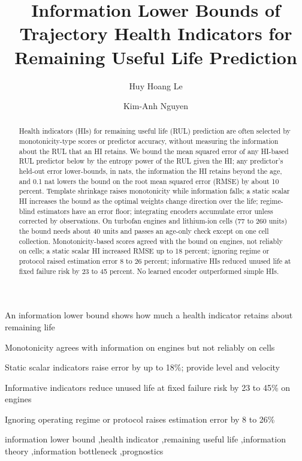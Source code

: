 \documentclass[preprint,12pt]{elsarticle}
\theoremstyle{definition}
\begin{document}
\linenumbers
\begin{frontmatter}
\title{Information Lower Bounds of Trajectory Health Indicators for Remaining Useful Life Prediction}
\author[pm]{Huy Hoang Le}
\author[dut]{Kim-Anh Nguyen}

\begin{highlights}
\item An information lower bound shows how much a health indicator retains about remaining life
\item Monotonicity agrees with information on engines but not reliably on cells
\item Static scalar indicators raise error by up to 18\%; provide level and velocity
\item Informative indicators reduce unused life at fixed failure risk by 23 to 45\% on engines
\item Ignoring operating regime or protocol raises estimation error by 8 to 26\%
\end{highlights}

\begin{abstract}
Health indicators (HIs) for remaining useful life (RUL) prediction are often selected by monotonicity-type scores or predictor accuracy, without measuring the information about the RUL that an HI retains. We bound the mean squared error of any HI-based RUL predictor below by the entropy power of the RUL given the HI; any predictor's held-out error lower-bounds, in nats, the information the HI retains beyond the age, and 0.1 nat lowers the bound on the root mean squared error (RMSE) by about 10 percent. Template shrinkage raises monotonicity while information falls; a static scalar HI increases the bound as the optimal weights change direction over the life; regime-blind estimators have an error floor; integrating encoders accumulate error unless corrected by observations. On turbofan engines and lithium-ion cells (77 to 260 units) the bound needs about 40 units and passes an age-only check except on one cell collection. Monotonicity-based scores agreed with the bound on engines, not reliably on cells; a static scalar HI increased RMSE up to 18 percent; ignoring regime or protocol raised estimation error 8 to 26 percent; informative HIs reduced unused life at fixed failure risk by 23 to 45 percent. No learned encoder outperformed simple HIs.
\end{abstract}

\begin{keyword}
information lower bound \sep health indicator \sep remaining useful life \sep information theory \sep information bottleneck \sep prognostics
\end{keyword}
\end{frontmatter}
\end{document}
